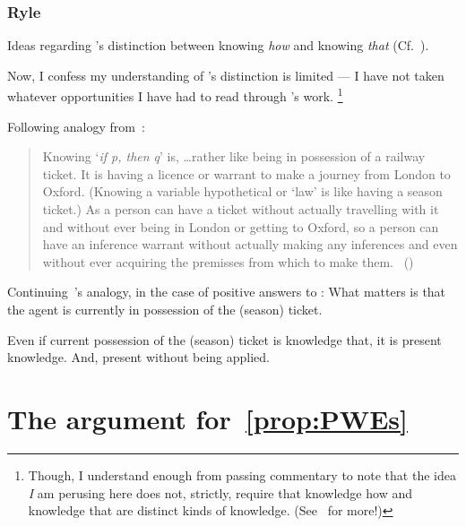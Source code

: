 \subsubsection{Ryle}

\begin{note}
  Ideas regarding \citeauthor{Ryle:1946tu}'s distinction between knowing \emph{how} and knowing \emph{that} (Cf.~\citeyear{Ryle:1946tu}).

  Now, I confess my understanding of \citeauthor{Ryle:1946tu}'s distinction is limited --- I have not taken whatever opportunities I have had to read through \citeauthor{Ryle:1946tu}'s work.%
  \footnote{
    Though, I understand enough from passing commentary to note that the idea \emph{I} am perusing here does not, strictly, require that knowledge how and knowledge that are distinct kinds of knowledge.
    (See~\textcite{Pavese:2022up} for more!)
  }

  Following analogy from~\textcite{Ryle:2009us}:

  \begin{quote}
    Knowing `\emph{if p, then q}' is, \dots rather like being in possession of a railway ticket.
    It is having a licence or warrant to make a journey from London to Oxford.
    (Knowing a variable hypothetical or `law' is like having a season ticket.)
    As a person can have a ticket without actually travelling with it and without ever being in London or getting to Oxford, so a person can have an inference warrant without actually making any inferences and even without ever acquiring the premisses from which to make them.%
    \mbox{ }\hfill\mbox{(\citeyear[250]{Ryle:2009us})}
  \end{quote}

  Continuing~\citeauthor{Ryle:2009us}'s analogy, in the case of positive answers to \qzS{}:
  What matters is that the agent is currently in possession of the (season) ticket.

  Even if current possession of the (season) ticket is knowledge that, it is present knowledge.
  And, present without being applied.
\end{note}


\section{The argument for~\autoref{prop:PWEs}}
\label{cha:zSpA:sec:return-simple-arg}

